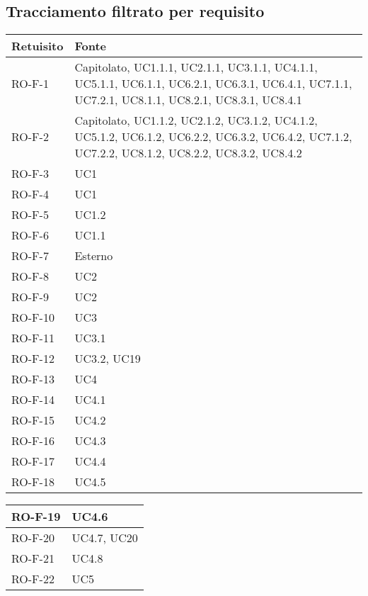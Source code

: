 \subsection{Tracciamento filtrato per requisito}
\begin{center}
\renewcommand{\arraystretch}{1.8} %
\begin{tabular}{ |m{8em}|m{13em}| }
    \hline
    \textbf{Retuisito} & \textbf{Fonte} \\
    \hline
    RO-F-1  &   Capitolato, UC1.1.1, UC2.1.1, UC3.1.1, UC4.1.1, UC5.1.1, UC6.1.1, UC6.2.1, UC6.3.1, UC6.4.1, UC7.1.1, UC7.2.1, UC8.1.1, UC8.2.1, UC8.3.1, UC8.4.1 \\
    \hline
    RO-F-2  &   Capitolato, UC1.1.2, UC2.1.2, UC3.1.2, UC4.1.2, UC5.1.2, UC6.1.2, UC6.2.2, UC6.3.2, UC6.4.2, UC7.1.2, UC7.2.2, UC8.1.2, UC8.2.2, UC8.3.2, UC8.4.2 \\
    \hline
    RO-F-3  &   UC1 \\
    \hline
    RO-F-4  &   UC1 \\
    \hline
    RO-F-5  &   UC1.2 \\
    \hline
    RO-F-6  &   UC1.1 \\
    \hline
    RO-F-7  &   Esterno \\
    \hline
    RO-F-8  &   UC2 \\
    \hline
    RO-F-9  &   UC2 \\
    \hline
    RO-F-10  &  UC3 \\
    \hline
    RO-F-11  &  UC3.1 \\
    \hline
    RO-F-12  &  UC3.2, UC19 \\
    \hline
    RO-F-13  &  UC4 \\
    \hline
    RO-F-14  &  UC4.1 \\
    \hline
    RO-F-15  &  UC4.2 \\
    \hline
    RO-F-16  &  UC4.3 \\
    \hline
    RO-F-17  &  UC4.4 \\
    \hline
    RO-F-18  &  UC4.5 \\
    \hline
    \end{tabular}
    \newpage
    \begin{tabular}{ |m{8em}|m{13em}| }
    \hline
    RO-F-19  &  UC4.6 \\
    \hline
    RO-F-20  &  UC4.7, UC20 \\
    \hline
    RO-F-21  &  UC4.8 \\
    \hline
    RO-F-22  &  UC5 \\

\end{tabular}
\end{center}

